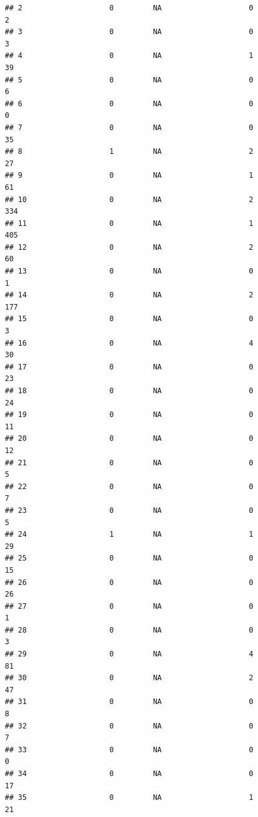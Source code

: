 \documentclass[
]{article}
\begin{document}
\begin{verbatim}
## 2                    0         NA                    0                  2
## 3                    0         NA                    0                  3
## 4                    0         NA                    1                 39
## 5                    0         NA                    0                  6
## 6                    0         NA                    0                  0
## 7                    0         NA                    0                 35
## 8                    1         NA                    2                 27
## 9                    0         NA                    1                 61
## 10                   0         NA                    2                334
## 11                   0         NA                    1                405
## 12                   0         NA                    2                 60
## 13                   0         NA                    0                  1
## 14                   0         NA                    2                177
## 15                   0         NA                    0                  3
## 16                   0         NA                    4                 30
## 17                   0         NA                    0                 23
## 18                   0         NA                    0                 24
## 19                   0         NA                    0                 11
## 20                   0         NA                    0                 12
## 21                   0         NA                    0                  5
## 22                   0         NA                    0                  7
## 23                   0         NA                    0                  5
## 24                   1         NA                    1                 29
## 25                   0         NA                    0                 15
## 26                   0         NA                    0                 26
## 27                   0         NA                    0                  1
## 28                   0         NA                    0                  3
## 29                   0         NA                    4                 81
## 30                   0         NA                    2                 47
## 31                   0         NA                    0                  8
## 32                   0         NA                    0                  7
## 33                   0         NA                    0                  0
## 34                   0         NA                    0                 17
## 35                   0         NA                    1                 21

\end{verbatim}
\end{document}
